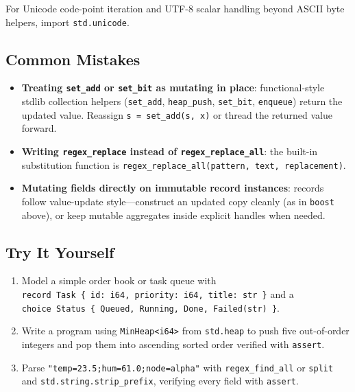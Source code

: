 \documentclass[
  english,
  oneside]{book}
\providecommand{\tightlist}{%
  \setlength{\itemsep}{0pt}\setlength{\parskip}{0pt}}
\begin{document}
For Unicode code-point iteration and UTF-8 scalar handling beyond ASCII
byte helpers, import \texttt{std.unicode}.

\subsection{Common Mistakes}\label{common-mistakes-4}

\begin{itemize}
\tightlist
\item
  \textbf{Treating \texttt{set\_add} or \texttt{set\_bit} as mutating in
  place}: functional-style stdlib collection helpers (\texttt{set\_add},
  \texttt{heap\_push}, \texttt{set\_bit}, \texttt{enqueue}) return the
  updated value. Reassign \texttt{s\ =\ set\_add(s,\ x)} or thread the
  returned value forward.
\item
  \textbf{Writing \texttt{regex\_replace} instead of
  \texttt{regex\_replace\_all}}: the built-in substitution function is
  \texttt{regex\_replace\_all(pattern,\ text,\ replacement)}.
\item
  \textbf{Mutating fields directly on immutable record instances}:
  records follow value-update style---construct an updated copy cleanly
  (as in \texttt{boost} above), or keep mutable aggregates inside
  explicit handles when needed.
\end{itemize}

\subsection{Try It Yourself}\label{try-it-yourself-4}

\begin{enumerate}
\def\labelenumi{\arabic{enumi}.}
\tightlist
\item
  Model a simple order book or task queue with
  \texttt{record\ Task\ \{\ id:\ i64,\ priority:\ i64,\ title:\ str\ \}}
  and a
  \texttt{choice\ Status\ \{\ Queued,\ Running,\ Done,\ Failed(str)\ \}}.
\item
  Write a program using \texttt{MinHeap\textless{}i64\textgreater{}}
  from \texttt{std.heap} to push five out-of-order integers and pop them
  into ascending sorted order verified with \texttt{assert}.
\item
  Parse \texttt{"temp=23.5;hum=61.0;node=alpha"} with
  \texttt{regex\_find\_all} or \texttt{split} and
  \texttt{std.string.strip\_prefix}, verifying every field with
  \texttt{assert}.
\end{enumerate}
\end{document}
